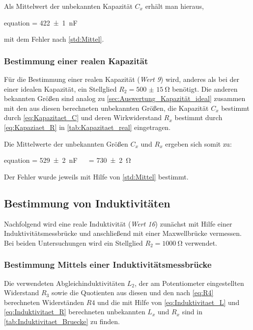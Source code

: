 			
	
		Als Mittelwert der unbekannten Kapazität $C_{x}$ erhält man hieraus,
		\begin{empheq}{equation}
			 = \SI{422(1)}{\nano\farad}
		\end{empheq} 
		mit dem Fehler nach \cref{std:Mittel}.
		
	\subsubsection{Bestimmung einer realen Kapazität}
	\label{sec:Auswertung_Kapazität_real}
		
		Für die Bestimmung einer realen Kapazität (\emph{Wert 9}) wird, anderes als bei der einer idealen Kapazität, ein
		Stellglied $R_{2} = \SI{500(15)}{\ohm}$ benötigt. Die anderen bekannten Größen sind analog zu
		 \cref{sec:Auswertung_Kapazität_ideal} zusammen mit den aus diesen 
		berechneten unbekannten Größen, die Kapazität $C_{x}$ bestimmt durch \cref{eq:Kapazitaet_C} und deren
		 Wirkwiderstand $R_{x}$ bestimmt durch \cref{eq:Kapaziaet_R} in 
		\cref{tab:Kapazitaet_real} eingetragen. 
	
		
		
		Die Mittelwerte der unbekannten Größen $C_{x}$ und $R_{x}$ ergeben sich somit zu:
		\begin{empheq}{equation}
				 = \SI{529(2)}{\nano\farad} \quad\ \ \quad {} = \SI{730(2)}{\ohm}
		\end{empheq}  
		Der Fehler wurde jeweils mit Hilfe von \cref{std:Mittel} bestimmt.
\subsection{Bestimmung von Induktivitäten}
\label{sec:Auswertung_Induktivität}

	Nachfolgend wird eine reale Induktivität (\emph{Wert 16}) zunächst mit Hilfe einer Induktivitätsmessbrücke
	und anschließend mit einer Maxwellbrücke vermessen. Bei beiden Untersuchungen wird 
	ein Stellglied $R_{2} = \SI{1000}{\ohm}$ verwendet.
	
	\subsubsection{Bestimmung Mittels einer Induktivitätsmessbrücke}
	\label{sec:Auswertung_Induktivität_Messbrücke}
	
		Die verwendeten Abgleichinduktivitäten $L_{2}$, der am Potentiometer eingestellten Widerstand
		$R_{3}$ sowie die Quotienten aus diesen und den nach \cref{eq:R4} berechneten Widerständen $R4$
		und die mit Hilfe von \cref{eq:Induktivitaet_L} und \cref{eq:Induktivitaet_R} berechneten unbekannten $L_{x}$
		 und $R_{x}$ sind in \cref{tab:Induktivitaet_Bruecke} zu finden.    
		

